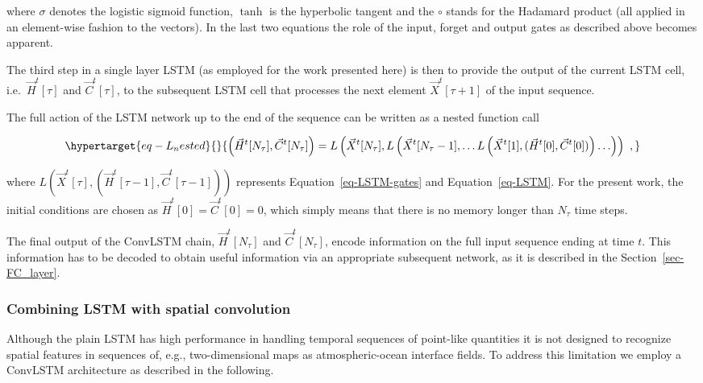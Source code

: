 \documentclass[
]{agujournal2019}
\begin{document}
where \(\sigma\) denotes the logistic sigmoid function, \(\tanh\) is the
hyperbolic tangent and the \(\circ\) stands for the Hadamard product
(all applied in an element-wise fashion to the vectors). In the last two
equations the role of the input, forget and output gates as described
above becomes apparent.

The third step in a single layer LSTM (as employed for the work
presented here) is then to provide the output of the current LSTM cell,
i.e.~\(\vec{H}^t[\tau]\) and \(\vec{C}^t[\tau]\), to the subsequent LSTM
cell that processes the next element \(\vec{X}^t[\tau+1]\) of the input
sequence.

The full action of the LSTM network up to the end of the sequence can be
written as a nested function call

\begin{equation}\protect\hypertarget{eq-L_nested}{}{
\left(\vec{H}^t[N_\tau], \vec{C}^t[N_\tau] \right) = L \left( \vec{X}^t[N_\tau], L \left( \vec{X}^t[N_\tau-1], \ldots L \left( \vec{X}^t[1], (\vec{H}^t[0], \vec{C}^t[0]) \right) \ldots \right) \right) \ ,
}\label{eq-L_nested}\end{equation}

where
\(L\left(\vec{X}^t[\tau], \left(\vec{H}^t[\tau-1], \vec{C}^t[\tau-1] \right) \right)\)
represents Equation~\ref{eq-LSTM-gates} and Equation~\ref{eq-LSTM}. For
the present work, the initial conditions are chosen as
\(\vec{H}^t[0]=\vec{C}^t[0]=0\), which simply means that there is no
memory longer than \(N_\tau\) time steps.

The final output of the ConvLSTM chain, \(\vec{H}^t[N_\tau]\) and
\(\vec{C}^t[N_\tau]\), encode information on the full input sequence
ending at time \(t\). This information has to be decoded to obtain
useful information via an appropriate subsequent network, as it is
described in the Section~\ref{sec-FC_layer}.

\hypertarget{combining-lstm-with-spatial-convolution}{%
\subsubsection{Combining LSTM with spatial
convolution}\label{combining-lstm-with-spatial-convolution}}

Although the plain LSTM has high performance in handling temporal
sequences of point-like quantities it is not designed to recognize
spatial features in sequences of, e.g., two-dimensional maps as
atmospheric-ocean interface fields. To address this limitation we employ
a ConvLSTM architecture as described in the following.
\end{document}

